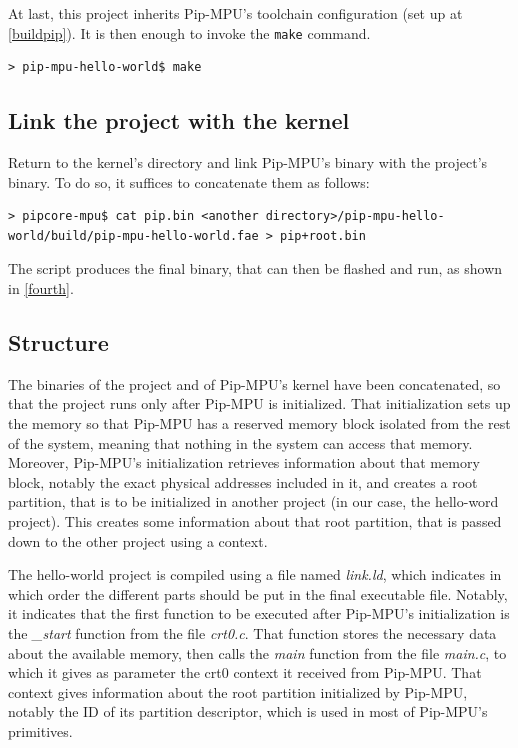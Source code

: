 \documentclass[10pt,a4paper,titlepage]{refart}
\begin{document}
At last, this project inherits Pip-MPU's toolchain configuration (set up at \ref{buildpip}).
It is then enough to invoke the \texttt{make} command.

\begin{lstlisting}[style=BashStyle]
> pip-mpu-hello-world$ make
\end{lstlisting}

\subsection{Link the project with the kernel}
Return to the kernel's directory and link Pip-MPU's binary with the project's binary. To do so, it suffices to concatenate 
them as follows:

\begin{lstlisting}[style=BashStyle]
> pipcore-mpu$ cat pip.bin <another directory>/pip-mpu-hello-world/build/pip-mpu-hello-world.fae > pip+root.bin
\end{lstlisting}

The script produces the final binary, that can then be flashed and run, as shown in \cref{fourth}.

\subsection{Structure}\label{subsec:structure}
The binaries of the project and of Pip-MPU's kernel have been concatenated, so that the project runs only after Pip-MPU is 
initialized. That initialization sets up the memory so that Pip-MPU has a reserved memory block isolated from the rest of the system, 
meaning that nothing in the system can access that memory. Moreover, Pip-MPU's initialization retrieves information about that memory 
block, notably the exact physical addresses included in it, and creates a root partition, that is to be initialized in another project 
(in our case, the hello-word project). This creates some information about that root partition, that is passed down to the other 
project using a context.

The hello-world project is compiled using a file named \textit{link.ld}, which indicates in which order the different parts should be 
put in the final executable file. Notably, it indicates that the first function to be executed after Pip-MPU's initialization is the 
\textit{\_start} function from the file \textit{crt0.c}. That function stores the necessary data about the available memory, then calls 
the \textit{main} function from the file \textit{main.c}, to which it gives as parameter the crt0 context it received from Pip-MPU. That
context gives information about the root partition initialized by Pip-MPU, notably the ID of its partition descriptor, which is used
in most of Pip-MPU's primitives. %
\end{document}
